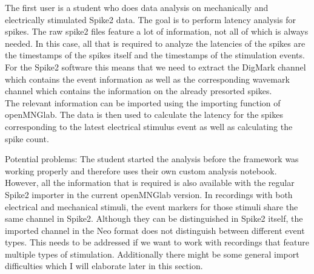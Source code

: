 The first user is a student who does data analysis on mechanically and electrically stimulated Spike2 data. The goal is to perform latency analysis for spikes.  The raw spike2 files feature a lot of information, not all of which is always needed. In this case, all that is required to analyze the latencies of the spikes are the timestamps of the spikes itself and the timestamps of the stimulation events. For the Spike2 software this means that we need to extract the DigMark channel which contains the event information as well as the corresponding wavemark channel which contains the information on the already presorted spikes.\\
The relevant information can be imported using the importing function of openMNGlab. 
The data is then used to calculate the latency for the spikes corresponding to the latest electrical stimulus event as well as calculating the spike count.

Potential problems: The student started the analysis before the framework was working properly and therefore uses their own custom analysis notebook. However, all the information that is required is also available with the regular Spike2 importer in the current openMNGlab version.
In recordings with both electrical and mechanical stimuli, the event markers for those stimuli share the same channel in Spike2. Although they can be distinguished in Spike2 itself, the imported channel in the Neo format does not distinguish between different event types. This needs to be addressed if we want to work with recordings that feature multiple types of stimulation.
Additionally there might be some general import difficulties which I will elaborate later in this section.
 

